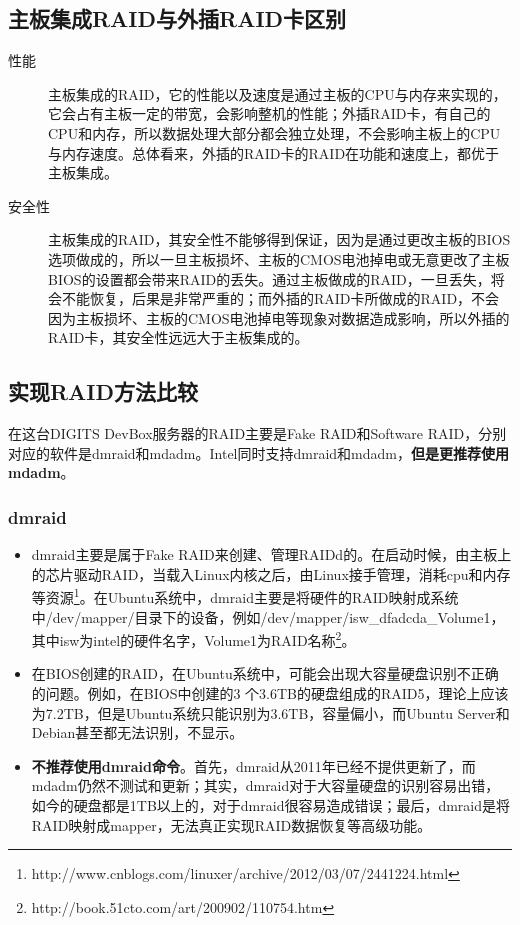 \subsection{主板集成RAID与外插RAID卡区别}
\begin{description}
\item[性能] 主板集成的RAID，它的性能以及速度是通过主板的CPU与内存来实现的，它会占有主板一定的带宽，会影响整机的性能；外插RAID卡，有自己的CPU和内存，所以数据处理大部分都会独立处理，不会影响主板上的CPU与内存速度。总体看来，外插的RAID卡的RAID在功能和速度上，都优于主板集成。

\item[安全性] 主板集成的RAID，其安全性不能够得到保证，因为是通过更改主板的BIOS选项做成的，所以一旦主板损坏、主板的CMOS电池掉电或无意更改了主板BIOS的设置都会带来RAID的丢失。通过主板做成的RAID，一旦丢失，将会不能恢复，后果是非常严重的；而外插的RAID卡所做成的RAID，不会因为主板损坏、主板的CMOS电池掉电等现象对数据造成影响，所以外插的RAID卡，其安全性远远大于主板集成的。
\end{description}


\subsection{实现RAID方法比较}
在这台DIGITS DevBox服务器的RAID主要是Fake RAID和Software RAID，分别对应的软件是dmraid和mdadm。Intel同时支持dmraid和mdadm，\textbf{但是更推荐使用mdadm}。
\subsubsection{dmraid}
\begin{itemize}
\item dmraid主要是属于Fake RAID来创建、管理RAIDd的。在启动时候，由主板上的芯片驱动RAID，当载入Linux内核之后，由Linux接手管理，消耗cpu和内存等资源\footnote{http://www.cnblogs.com/linuxer/archive/2012/03/07/2441224.html}。在Ubuntu系统中，dmraid主要是将硬件的RAID映射成系统中/dev/mapper/目录下的设备，例如/dev/mapper/isw\_dfadcda\_Volume1，其中isw为intel的硬件名字，Volume1为RAID名称\footnote{http://book.51cto.com/art/200902/110754.htm}。

\item 在BIOS创建的RAID，在Ubuntu系统中，可能会出现大容量硬盘识别不正确的问题。例如，在BIOS中创建的3 个3.6TB的硬盘组成的RAID5，理论上应该为7.2TB，但是Ubuntu系统只能识别为3.6TB，容量偏小，而Ubuntu Server和Debian甚至都无法识别，不显示。

\item \textbf{不推荐使用dmraid命令}。首先，dmraid从2011年已经不提供更新了，而mdadm仍然不测试和更新；其实，dmraid对于大容量硬盘的识别容易出错，如今的硬盘都是1TB以上的，对于dmraid很容易造成错误；最后，dmraid是将RAID映射成mapper，无法真正实现RAID数据恢复等高级功能。
\end{itemize}

